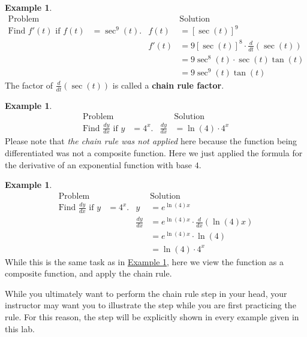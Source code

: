 \documentclass[10pt,oneside,]{book}
\newcommand{\terminology}[1]{\textbf{#1}}
\theoremstyle{plain}
\theoremstyle{definition}
\newtheorem{example}[theorem]{Example}
\numberwithin{equation}{section}
\newcommand{\fe}[2]{#1\mathopen{}\left(#2\right)\mathclose{}}
\newcommand{\fd}[1]{#1'}
\newcommand{\lz}[2]{\frac{d#1}{d#2}}
\newcommand{\lzoo}[2]{{\frac{d}{d#1}}{\left(#2\right)}}
\begin{document}
\begin{example}\label{example-second-chain-rule}
\begin{align*}
\text{Problem}&&&\text{Solution}\\
\text{Find }\fe{\fd{f}}{t}\text{ if }\fe{f}{t}&=\fe{\sec^9}{t}\text{.}&\fe{f}{t}&=\left[\fe{\sec}{t}\right]^9\\
&&\fe{\fd{f}}{t}&=9\left[\fe{\sec}{t}\right]^8\cdot\lzoo{t}{\fe{\sec}{t}}\\
&&&=9\fe{\sec^8}{t}\cdot\fe{\sec}{t}\fe{\tan}{t}\\
&&&=9\fe{\sec^9}{t}\fe{\tan}{t}
\end{align*}The factor of \(\lzoo{t}{\fe{\sec}{t}}\) is called a \terminology{chain rule factor}.%
\end{example}
\begin{example}\label{example-third-chain-rule}
\begin{align*}
\text{Problem}&&&\text{Solution}\\
\text{Find }\lz{y}{x}\text{ if }y&=4^x\text{.}&\lz{y}{x}&=\fe{\ln}{4}\cdot4^x
\end{align*}Please note that \emph{the chain rule was not applied} here because the function being differentiated was not a composite function. Here we just applied the formula for the derivative of an exponential function with base \(4\).%
\end{example}
\begin{example}\label{example-fourth-chain-rule}
\begin{align*}
\text{Problem}&&&\text{Solution}\\
\text{Find }\lz{y}{x}\text{ if }y&=4^x\text{.}&y&=e^{\fe{\ln}{4}x}\\
&&\lz{y}{x}&=e^{\fe{\ln}{4}x}\cdot\lzoo{x}{\fe{\ln}{4}x}\\
&&&=e^{\fe{\ln}{4}x}\cdot\fe{\ln}{4}\\
&&&=\fe{\ln}{4}\cdot4^{x}
\end{align*}While this is the same task as in \hyperref[example-third-chain-rule]{Example \ref{example-third-chain-rule}}, here we view the function as a composite function, and apply the chain rule.%
\end{example}
\par
While you ultimately want to perform the chain rule step in your head, your instructor may want you to illustrate the step while you are first practicing the rule.  For this reason, the step will be explicitly shown in every example given in this lab.%
\typeout{************************************************}
\typeout{************************************************}
\end{document}
